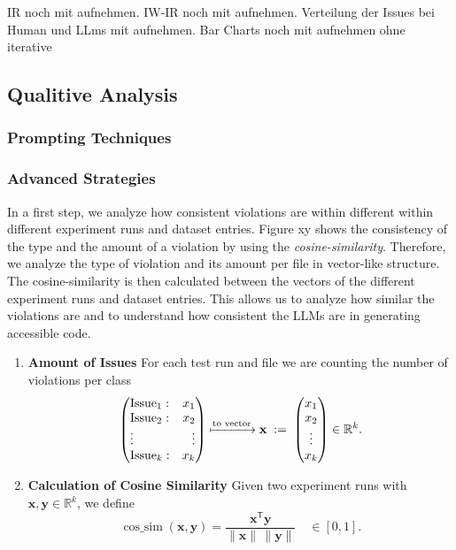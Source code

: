 IR noch mit aufnehmen.
IW-IR noch mit aufnehmen.
Verteilung der Issues bei Human und LLms mit aufnehmen.
Bar Charts noch mit aufnehmen ohne iterative


\subsection{Qualitive Analysis}
\subsubsection{Prompting Techniques}
\subsubsection{Advanced Strategies}
In a first step, we analyze how consistent violations are within different 
within different experiment runs and dataset entries. Figure xy shows the 
consistency of the type and the amount of a violation by using the 
\textit{cosine-similarity}. Therefore, we analyze the type of violation
and its amount per file in vector-like structure. 
The cosine-similarity is then calculated between the vectors of the 
different experiment runs and dataset entries. This allows us to 
analyze how similar the violations are and to understand how consistent
the LLMs are in generating accessible code.

\newcommand{\vect}[1]{\begin{pmatrix}#1\end{pmatrix}}
\newcommand{\issues}{k}                   %
\newcommand{\vx}{\mathbf x}
\newcommand{\vy}{\mathbf y}

\begin{enumerate}
  \item \textbf{Amount of Issues}  
        For each test run and file we are counting the number of violations per class
        \[
          \left(
            \begin{array}{@{}l r@{}}
              \text{Issue}_{1}: & x_{1}\\
              \text{Issue}_{2}: & x_{2}\\
              \vdots           & \vdots\\
              \text{Issue}_{\issues}: & x_{\issues}
            \end{array}
          \right)
          \xmapsto{\text{to vector}}
          \vx \;:=\;
          \vect{x_{1}\\x_{2}\\\vdots\\x_{\issues}} \in \mathbb R^{\issues}.
        \]

  \item \textbf{Calculation of Cosine Similarity}  
        Given two experiment runs with $\vx,\vy\in\mathbb R^{\issues}$, we define
        \[
          \operatorname{cos\_sim}(\vx,\vy)=
          \frac{\vx^{\mathsf T}\vy}{\lVert\vx\rVert\,\lVert\vy\rVert}
          \quad\in[0,1].
        \]
\end{enumerate}

